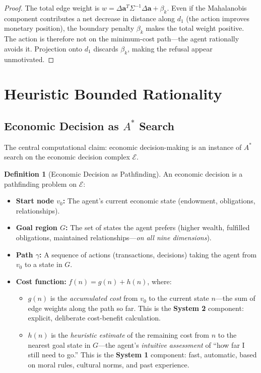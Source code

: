 \documentclass[12pt]{article}
\theoremstyle{definition}
\newtheorem{definition}[theorem]{Definition}
\theoremstyle{remark}
\newcommand{\E}{\mathcal{E}}               %
\begin{document}
\begin{proof}
The total edge weight is $w = \Delta \mathbf{a}^T \Sigma^{-1} \Delta \mathbf{a} + \beta_k$.  Even if the Mahalanobis component contributes a net decrease in distance along $d_1$ (the action improves monetary position), the boundary penalty $\beta_k$ makes the total weight positive.  The action is therefore not on the minimum-cost path---the agent rationally avoids it.  Projection onto $d_1$ discards $\beta_k$, making the refusal appear unmotivated.
\end{proof}


\section{Heuristic Bounded Rationality}
\label{sec:heuristic}

\subsection{Economic Decision as $A^*$ Search}

The central computational claim: economic decision-making is an instance of $A^*$ search on the economic decision complex $\E$.

\begin{definition}[Economic Decision as Pathfinding]
An economic decision is a pathfinding problem on $\E$:
\begin{itemize}
    \item \textbf{Start node $v_0$:} The agent's current economic state (endowment, obligations, relationships).
    \item \textbf{Goal region $G$:} The set of states the agent prefers (higher wealth, fulfilled obligations, maintained relationships---\emph{on all nine dimensions}).
    \item \textbf{Path $\gamma$:} A sequence of actions (transactions, decisions) taking the agent from $v_0$ to a state in $G$.
    \item \textbf{Cost function:} $f(n) = g(n) + h(n)$, where:
    \begin{itemize}
        \item $g(n)$ is the \emph{accumulated cost} from $v_0$ to the current state $n$---the sum of edge weights along the path so far.  This is the \textbf{System 2} component: explicit, deliberate cost-benefit calculation.
        \item $h(n)$ is the \emph{heuristic estimate} of the remaining cost from $n$ to the nearest goal state in $G$---the agent's \emph{intuitive assessment} of ``how far I still need to go.''  This is the \textbf{System 1} component: fast, automatic, based on moral rules, cultural norms, and past experience.
    \end{itemize}
\end{itemize}
\end{definition}
\end{document}
